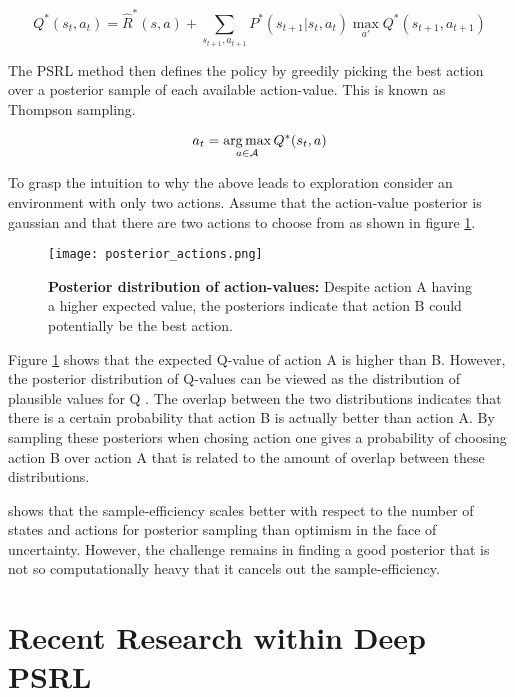 \begin{equation}
 \label{eq:bayesian_bellman}
 Q^*(s_t,a_t) = \hat{R}^*(s,a) + \sum_{s_{t+1}, a_{t+1}}P^*(s_{t+1}|s_t,a_t)\max_{a'}Q^*(s_{t+1}, a_{t+1})
\end{equation}

The PSRL method then defines the policy by greedily picking the best action over a posterior sample of each available action-value. This is known as Thompson sampling. \citep{strens_2000}\citep{osband_2016}

\begin{equation}
a_t = \operatorname*{arg\,max}_{a\in\mathcal{A}} Q^*(s_t,a)
\end{equation}

To grasp the intuition to why the above leads to exploration consider an environment with only two actions. Assume that the action-value posterior is gaussian and that there are two actions to choose from as shown in figure \ref{fig:posterior-qvalues}.
 
\begin{figure}[H]
\centering
\texttt{[image: posterior\_actions.png]}
\captionsetup{width=.7\linewidth}
\caption{\textbf{Posterior distribution of action-values:} Despite action A having a higher expected value, the posteriors indicate that action B could potentially be the best action.}
\label{fig:posterior-qvalues}
\end{figure}


Figure \ref{fig:posterior-qvalues} shows that the expected Q-value of action A is higher than B. However, the posterior distribution of Q-values can be viewed as the distribution of plausible values for Q \citep{osband_2016}. The overlap between the two distributions indicates that there is a certain probability that action B is actually better than action A. By sampling these posteriors when chosing action one gives a probability of choosing action B over action A that is related to the amount of overlap between these distributions.

\cite{osband_2016} shows that the sample-efficiency scales better with respect to the number of states and actions for posterior sampling than optimism in the face of uncertainty. However, the challenge remains in finding a good posterior that is not so computationally heavy that it cancels out the sample-efficiency.

\section{Recent Research within Deep PSRL}

